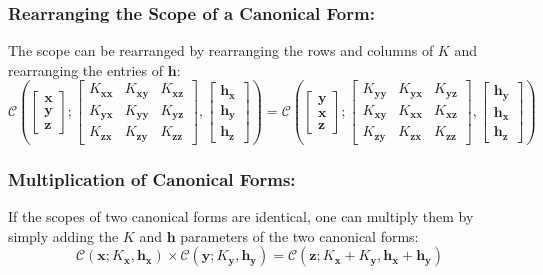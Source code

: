 \documentclass[12pt,oneside,openany,a4paper, %
afrikaans,english,
]{memoir}
\numberwithin{equation}{chapter}
\begin{document}
\subsubsection{Rearranging the Scope of a Canonical Form:}
The scope can be rearranged by rearranging the rows and columns of $K$  and rearranging the entries of $\bm{h}$:
\begin{equation}
\mathcal{C}\left(
\begin{bmatrix}
\bm{x}\\
\bm{y}\\
\bm{z}
\end{bmatrix};
\begin{bmatrix}
K_{\bm{xx}} & K_{\bm{xy}} & K_{\bm{xz}}\\
K_{\bm{yx}} & K_{\bm{yy}} & K_{\bm{yz}}\\
K_{\bm{zx}} & K_{\bm{zy}} & K_{\bm{zz}}
\end{bmatrix},
\begin{bmatrix}
\bm{h_x}\\
\bm{h_y}\\
\bm{h_z}
\end{bmatrix}
\right)
=
\mathcal{C}\left(
\begin{bmatrix}
\bm{y}\\
\bm{x}\\
\bm{z}
\end{bmatrix};
\begin{bmatrix}
K_{\bm{yy}} & K_{\bm{yx}} & K_{\bm{yz}}\\
K_{\bm{xy}} & K_{\bm{xx}} & K_{\bm{xz}}\\
K_{\bm{zy}} & K_{\bm{zx}} & K_{\bm{zz}}
\end{bmatrix},
\begin{bmatrix}
\bm{h_y}\\
\bm{h_x}\\
\bm{h_z}
\end{bmatrix}
\right)
\end{equation}
\subsubsection{Multiplication of Canonical Forms:}
If the scopes of two canonical forms are identical, one can multiply them by simply adding the $K$ and $\bm{h}$ parameters of the two canonical forms:
\begin{equation}\label{eq:10}
\mathcal{C} (\bm{x}; K_{\bm{x}},\bm{h_x}) \times \mathcal{C} (\bm{y}; K_{\bm{y}},\bm{h_y})= \mathcal{C} (\bm{z};K_{\bm{x}} + K_{\bm{y}}, \bm{h_x} + \bm{h_y})
\end{equation}
\end{document}
